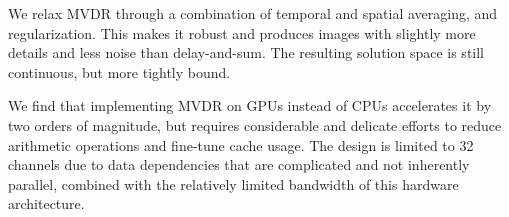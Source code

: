 We relax MVDR through a combination of temporal and spatial averaging, and regularization. This makes it robust and produces images with slightly more details and less noise than delay-and-sum. The resulting solution space is still continuous, but more tightly bound.

We find that implementing MVDR on GPUs instead of CPUs accelerates it by two orders of magnitude, but requires considerable and delicate efforts to reduce arithmetic operations and fine-tune cache usage. The design is limited to 32 channels due to data dependencies that are complicated and not inherently parallel, combined with the relatively limited bandwidth of this hardware architecture. 



%

%




%

